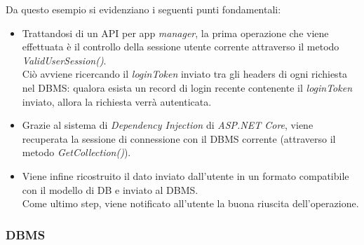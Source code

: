 \documentclass[12pt]{article}
\begin{document}
Da questo esempio si evidenziano i seguenti punti fondamentali:
\begin{itemize}
	\item Trattandosi di un API per app \textit{manager}, la prima operazione che viene effettuata è il controllo della sessione utente corrente attraverso il metodo \textit{ValidUserSession()}.\\
	Ciò avviene ricercando il \textit{loginToken} inviato tra gli headers di ogni richiesta nel DBMS: qualora esista un record di login recente contenente il \textit{loginToken} inviato, allora la richiesta verrà autenticata.
	\item Grazie al sistema di \textit{Dependency Injection} di \textit{ASP.NET Core}, viene recuperata la sessione di connessione con il DBMS corrente (attraverso il metodo \textit{GetCollection()}).
	\item Viene infine ricostruito il dato inviato dall'utente in un formato compatibile con il modello di DB e inviato al DBMS.\\ Come ultimo step, viene notificato all'utente la buona riuscita dell'operazione.
\end{itemize}
\subsubsection{DBMS}
\end{document}
